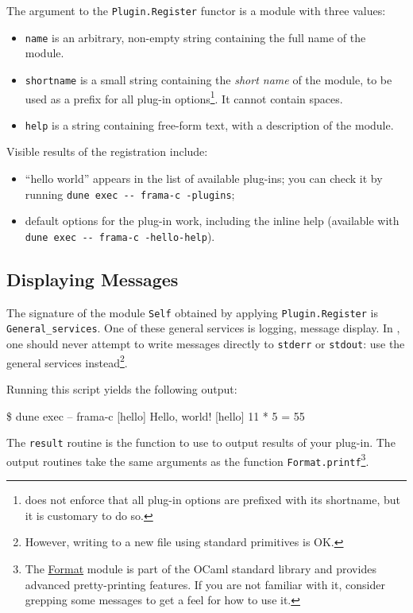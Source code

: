 The argument to the \texttt{Plugin.Register} functor is a module with three
values:
\begin{itemize}
\item \texttt{name} is an arbitrary, non-empty string containing the full name
  of the module.
\item \texttt{shortname} is a small string containing the {\em short name} of
  the module, to be used as a prefix for all plug-in options\footnote{\framac
  does  not enforce that all plug-in options are prefixed with its shortname,
  but it is customary to do so.}. It cannot contain spaces.
\item \texttt{help} is a string containing free-form text, with a
  description of the module.
\end{itemize}

Visible results of the registration include:
\begin{itemize}
\item ``hello world'' appears in the list of available plug-ins;
  you can check it by running
  \verb|dune exec -- frama-c -plugins|;
\item default options for the plug-in work, including the inline help
  (available with \verb|dune exec -- frama-c -hello-help|).
\end{itemize}

\subsection{Displaying Messages}\label{tut2:messages}

The signature of the module \texttt{Self} obtained by applying
\texttt{Plugin.Register} is \texttt{General\_services}. One of these general
services is logging, \ie message display. In \framac, one should never attempt
to write messages directly to \texttt{stderr} or \texttt{stdout}: use the
general services instead\footnote{However, writing to a new file using standard
  \ocaml primitives is OK.}.


Running this script yields the following output:
\begin{frama-c-commands}
\$ dune exec -- frama-c
[hello] Hello, world!
[hello] 11 * 5 = 55
\end{frama-c-commands}

The \texttt{result} routine is the function to use to output results of your
plug-in. The \framac output routines take the same arguments as the \caml
function \texttt{Format.printf}\footnote{The
\href{https://v2.ocaml.org/api/Format.html}{Format} module is part of the
OCaml standard library and provides advanced pretty-printing features.
If you are not familiar with it, consider grepping some \framac messages
to get a feel for how to use it.}.

